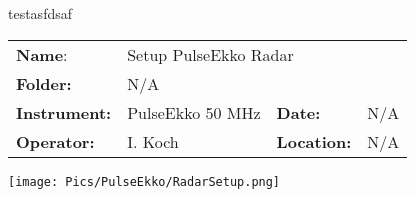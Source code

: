\documentclass[a4paper,12pt,twoside]{article}
\newcommand{\ProtocolTable}[6]
{
\begin{table}[]
\begin{tabular}{|p{1.8cm} p{3.8cm} p{1.8cm} p{2.0cm}|}
\hline
 \rowcolor{beaublue}\textbf{Name}:&\multicolumn{3}{l}{#1} \\
 \rowcolor{beaublue}\textbf{Folder:}&\multicolumn{3}{l}{#2} \\
 \rowcolor{beaublue}\textbf{Instrument:}&#3&\textbf{Date:}&#4 \\
  \rowcolor{beaublue}\textbf{Operator:}&#5&\textbf{Location:}&#6\\
\hline
\end{tabular}
\end{table}
}
\begin{document}
testasfdsaf 
\ProtocolTable{Setup PulseEkko Radar}{N/A}{PulseEkko 50 MHz}{N/A}{I. Koch}{N/A}

\begin{minipage}[t]{\textwidth}
\texttt{[image: Pics/PulseEkko/RadarSetup.png]}
\end{minipage}
\end{document}

